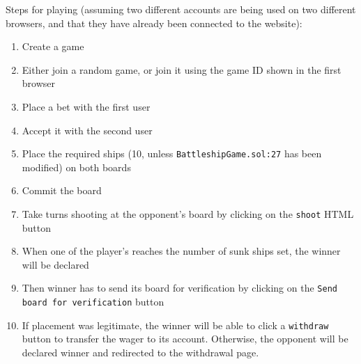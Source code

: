 Steps for playing (assuming two different accounts are being used on two
different browsers, and that they have already been connected to the website):
\begin{enumerate}
	\item Create a game
	\item Either join a random game, or join it using the game ID shown in the first
	      browser
	\item Place a bet with the first user
	\item Accept it with the second user
	\item Place the required ships (10, unless \texttt{BattleshipGame.sol:27}
	      has been modified) on both boards
	\item Commit the board
	\item Take turns shooting at the opponent's board by clicking on the
	      \texttt{shoot} HTML button
	\item When one of the player's reaches the number of sunk ships set, the winner will
	      be declared
	\item Then winner has to send its board for verification by clicking on the
	      \texttt{Send board for verification} button
	\item If placement was legitimate, the winner will be able to click a
	      \texttt{withdraw} button to transfer the wager to its account.
	      Otherwise, the opponent will be declared winner and redirected to the
	      withdrawal page.
\end{enumerate}

